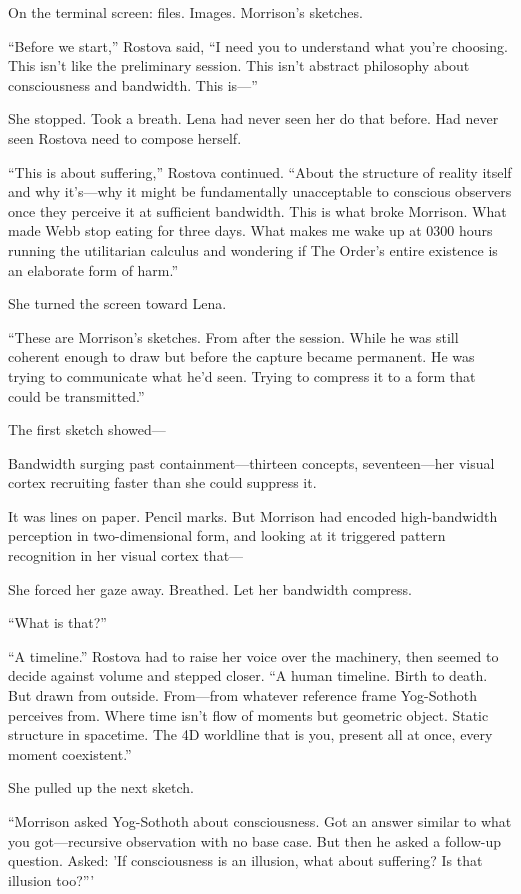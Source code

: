 On the terminal screen: files. Images. Morrison's sketches.

``Before we start,'' Rostova said, ``I need you to understand what you're choosing. This isn't like the preliminary session. This isn't abstract philosophy about consciousness and bandwidth. This is—''

She stopped. Took a breath. Lena had never seen her do that before. Had never seen Rostova need to compose herself.

``This is about suffering,'' Rostova continued. ``About the structure of reality itself and why it's—why it might be fundamentally unacceptable to conscious observers once they perceive it at sufficient bandwidth. This is what broke Morrison. What made Webb stop eating for three days. What makes me wake up at 0300 hours running the utilitarian calculus and wondering if The Order's entire existence is an elaborate form of harm.''

She turned the screen toward Lena.

``These are Morrison's sketches. From after the session. While he was still coherent enough to draw but before the capture became permanent. He was trying to communicate what he'd seen. Trying to compress it to a form that could be transmitted.''

The first sketch showed—

Bandwidth surging past containment---thirteen concepts, seventeen---her visual cortex recruiting faster than she could suppress it.

It was lines on paper. Pencil marks. But Morrison had encoded high-bandwidth perception in two-dimensional form, and looking at it triggered pattern recognition in her visual cortex that—

She forced her gaze away. Breathed. Let her bandwidth compress.

``What is that?''

``A timeline.'' Rostova had to raise her voice over the machinery, then seemed to decide against volume and stepped closer. ``A human timeline. Birth to death. But drawn from outside. From—from whatever reference frame Yog-Sothoth perceives from. Where time isn't flow of moments but geometric object. Static structure in spacetime. The 4D worldline that is you, present all at once, every moment coexistent.''

She pulled up the next sketch.

``Morrison asked Yog-Sothoth about consciousness. Got an answer similar to what you got—recursive observation with no base case. But then he asked a follow-up question. Asked: 'If consciousness is an illusion, what about suffering? Is that illusion too?'''


